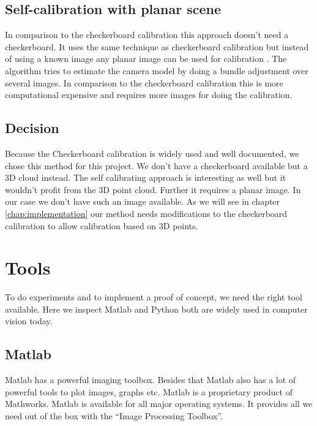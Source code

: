 \documentclass[11pt,a4paper,titlepage,oneside]{report}
\begin{document}
\subsection{Self-calibration with planar scene}
In comparison to the checkerboard calibration this approach doesn't need a checkerboard. It uses the same technique as checkerboard calibration but instead of using a known image any planar image can be used for calibration \cite{selfcalib}. The algorithm tries to estimate the camera model by doing a bundle adjustment over several images. In comparison to the checkerboard calibration this is more computational expensive and requires more images for doing the calibration.

\subsection{Decision}
Because the Checkerboard calibration is widely used and well documented, we chose this method for this project. We don't have a checkerboard available but a 3D cloud instead. The self calibrating approach is interesting as well but it wouldn't profit from the 3D point cloud. Further it requires a planar image. In our case we don't have such an image available. As we will see in chapter \ref{chap:implementation} our method needs modifications to the checkerboard calibration to allow calibration based on 3D points.

\section{Tools}
To do experiments and to implement a proof of concept, we need the right tool available. Here we inspect Matlab and Python both are widely used in computer vision today.

\subsection{Matlab}
Matlab has a powerful imaging toolbox. Besides that Matlab also has a lot of powerful tools to plot images, graphs etc. Matlab is a proprietary product of Mathworks. Matlab is available for all major operating systems. It provides all we need out of the box with the ``Image Processing Toolbox''.
\end{document}
